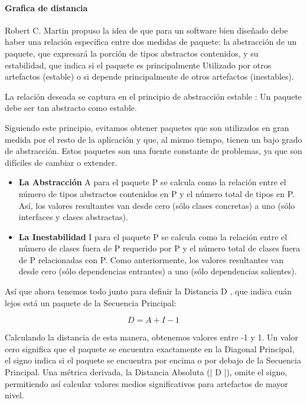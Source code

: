 \paragraph{Grafica de distancia}

Robert C. Martin propuso la idea de que para un software bien diseñado debe haber una relación específica entre dos medidas de paquete: la abstracción de un paquete, que expresará la porción de tipos abstractos contenidos, y su estabilidad, que indica si el paquete es principalmente Utilizado por otros artefactos (estable) o si depende principalmente de otros artefactos (inestables)\cite{Pw11D}.

La relación deseada se captura en el principio de abstracción estable : Un paquete debe ser tan abstracto como estable.

Siguiendo este principio, evitamos obtener paquetes que son utilizados en gran medida por el resto de la aplicación y que, al mismo tiempo, tienen un bajo grado de abstracción. Estos paquetes son una fuente constante de problemas, ya que son difíciles de cambiar o extender.

\begin{itemize}
	\item \textbf{La Abstracción} A para el paquete P se calcula como la relación entre el número de tipos abstractos contenidos en P y el número total de tipos en P. Así, los valores resultantes van desde cero (sólo clases concretas) a uno (sólo interfaces y clases abstractas).
	\item \textbf{La Inestabilidad} I para el paquete P se calcula como la relación entre el número de clases fuera de P requerido por P y el número total de clases fuera de P relacionadas con P. Como anteriormente, los valores resultantes van desde cero (sólo dependencias entrantes) a uno (sólo dependencias salientes).
\end{itemize}

Así que ahora tenemos todo junto para definir la Distancia D , que indica cuán lejos está un paquete de la Secuencia Principal:

$$D=A+I-1$$

Calculando la distancia de esta manera, obtenemos valores entre -1 y 1. Un valor cero significa que el paquete se encuentra exactamente en la Diagonal Principal, el signo indica si el paquete se encuentra por encima o por debajo de la Secuencia Principal. Una métrica derivada, la Distancia Absoluta (| D |), omite el signo, permitiendo así calcular valores medios significativos para artefactos de mayor nivel.

